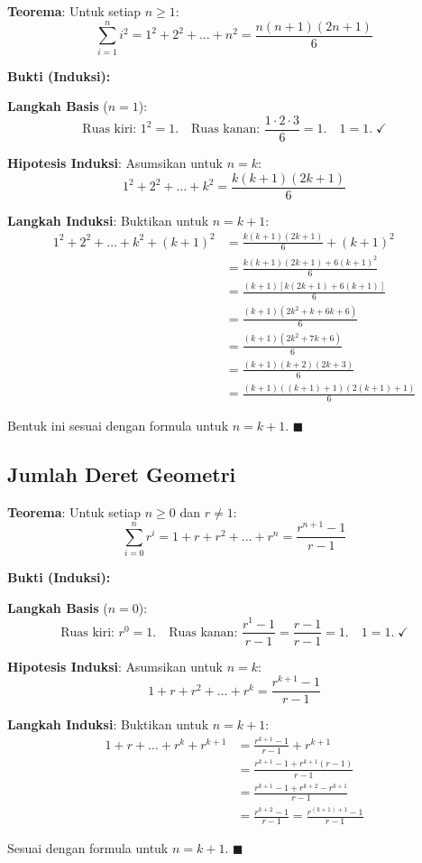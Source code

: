 \begin{contoh}
\textbf{Teorema}: Untuk setiap $n \geq 1$:
\[ \sum_{i=1}^{n} i^2 = 1^2 + 2^2 + \ldots + n^2 = \frac{n(n+1)(2n+1)}{6} \]

\textbf{Bukti (Induksi):}

\textbf{Langkah Basis} ($n = 1$):
\[ \text{Ruas kiri: } 1^2 = 1. \quad \text{Ruas kanan: } \frac{1 \cdot 2 \cdot 3}{6} = 1. \quad 1 = 1. \; \checkmark \]

\textbf{Hipotesis Induksi}: Asumsikan untuk $n = k$:
\[ 1^2 + 2^2 + \ldots + k^2 = \frac{k(k+1)(2k+1)}{6} \]

\textbf{Langkah Induksi}: Buktikan untuk $n = k + 1$:
\begin{align*}
1^2 + 2^2 + \ldots + k^2 + (k+1)^2 &= \frac{k(k+1)(2k+1)}{6} + (k+1)^2 \\
&= \frac{k(k+1)(2k+1) + 6(k+1)^2}{6} \\
&= \frac{(k+1)[k(2k+1) + 6(k+1)]}{6} \\
&= \frac{(k+1)(2k^2 + k + 6k + 6)}{6} \\
&= \frac{(k+1)(2k^2 + 7k + 6)}{6} \\
&= \frac{(k+1)(k+2)(2k+3)}{6} \\
&= \frac{(k+1)((k+1)+1)(2(k+1)+1)}{6}
\end{align*}

Bentuk ini sesuai dengan formula untuk $n = k + 1$. $\blacksquare$
\end{contoh}

\subsection{Jumlah Deret Geometri}

\begin{contoh}
\textbf{Teorema}: Untuk setiap $n \geq 0$ dan $r \neq 1$:
\[ \sum_{i=0}^{n} r^i = 1 + r + r^2 + \ldots + r^n = \frac{r^{n+1} - 1}{r - 1} \]

\textbf{Bukti (Induksi):}

\textbf{Langkah Basis} ($n = 0$):
\[ \text{Ruas kiri: } r^0 = 1. \quad \text{Ruas kanan: } \frac{r^1 - 1}{r - 1} = \frac{r - 1}{r - 1} = 1. \quad 1 = 1. \; \checkmark \]

\textbf{Hipotesis Induksi}: Asumsikan untuk $n = k$:
\[ 1 + r + r^2 + \ldots + r^k = \frac{r^{k+1} - 1}{r - 1} \]

\textbf{Langkah Induksi}: Buktikan untuk $n = k + 1$:
\begin{align*}
1 + r + \ldots + r^k + r^{k+1} &= \frac{r^{k+1} - 1}{r - 1} + r^{k+1} \\
&= \frac{r^{k+1} - 1 + r^{k+1}(r - 1)}{r - 1} \\
&= \frac{r^{k+1} - 1 + r^{k+2} - r^{k+1}}{r - 1} \\
&= \frac{r^{k+2} - 1}{r - 1} = \frac{r^{(k+1)+1} - 1}{r - 1}
\end{align*}

Sesuai dengan formula untuk $n = k + 1$. $\blacksquare$
\end{contoh}

